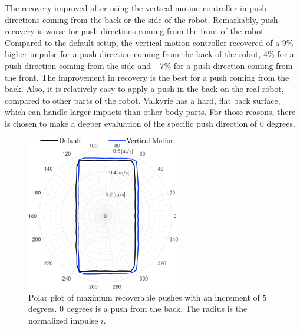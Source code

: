 The recovery improved after using the vertical motion controller in push directions coming from the back or the side of the robot. Remarkably, push recovery is worse for push directions coming from the front of the robot. Compared to the default setup, the vertical motion controller recovered of a $9$\% higher impulse for a push direction coming from the back of the robot, $4$\% for a push direction coming from the side and $-7$\% for a push direction coming from the front. The improvement in recovery is the best for a push coming from the back. Also, it is relatively easy to apply a push in the back on the real robot, compared to other parts of the robot. Valkyrie has a hard, flat back surface, which can handle larger impacts than other body parts. For those reasons, there is chosen to make a deeper evaluation of the specific push direction of $0$ degrees.
\begin{figure}
\centering
\includegraphics[width=0.6\textwidth]{STYLESTUFF/roundStanding.png}
\caption{Polar plot of maximum recoverable pushes with an increment of $5$ degrees. $0$ degrees is a push from the back. The radius is the normalized impulse $i$. }
\label{fig:roundStanding}
\end{figure}

